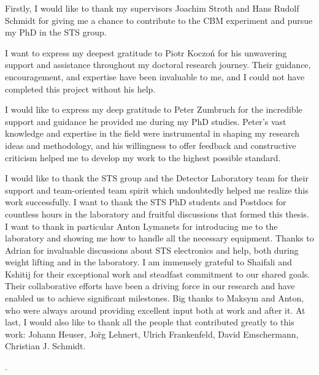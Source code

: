 \vspace{2cm}
\vspace{2cm}
Firstly, I would like to thank my supervisors Joachim Stroth and Hans Rudolf Schmidt for giving me a chance to contribute to the CBM experiment and pursue my PhD in the STS group.


I want to express my deepest gratitude to Piotr Koczoń for his unwavering support and assistance throughout my doctoral research journey. Their guidance, encouragement, and expertise have been invaluable to me, and I could not have completed this project without his help. 


I would like to express my deep gratitude to Peter Zumbruch for the incredible support and guidance he provided me during my PhD studies. Peter's vast knowledge and expertise in the field were instrumental in shaping my research ideas and methodology, and his willingness to offer feedback and constructive criticism helped me to develop my work to the highest possible standard. 

I would like to thank the STS group and the Detector Laboratory team for their support and team-oriented team spirit which undoubtedly helped me realize this work successfully. I want to thank the STS PhD students and Postdocs for countless hours in the laboratory and fruitful discussions that formed this thesis. I want to thank in particular Anton Lymanets for introducing me to the laboratory and showing me how to handle all the necessary equipment. Thanks to Adrian for invaluable discussions about STS electronics and help, both during weight lifting and in the laboratory. I am immensely grateful to Shaifali and Kshitij for their exceptional work and steadfast commitment to our shared goals. Their collaborative efforts have been a driving force in our research and have enabled us to achieve significant milestones. Big thanks to Maksym and Anton, who were always around providing excellent input both at work and after it. At last, I would also like to thank all the people that contributed greatly to this work: Johann Heuser, Jo\"rg Lehnert, Ulrich Frankenfeld, David Emschermann, Christian J. Schmidt.

.

